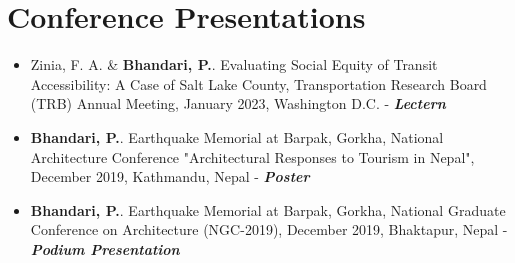 \section{\faAddressCard \textbf{ Conference Presentations}}
    \begin{itemize}[leftmargin=0.15in, label={}]
    	\item{Zinia, F. A. \& \textbf{Bhandari, P.}. Evaluating Social Equity of Transit Accessibility: A Case of Salt Lake County, Transportation Research Board (TRB) Annual Meeting, January 2023, Washington D.C. - \textbf{\textit{Lectern}}} \\
        \item{\textbf{Bhandari, P.}. Earthquake Memorial at Barpak, Gorkha, National Architecture Conference "Architectural Responses to Tourism in Nepal", December 2019, Kathmandu, Nepal - \textbf{\textit{Poster}}} \\
        \item{\textbf{Bhandari, P.}. Earthquake Memorial at Barpak, Gorkha, National Graduate Conference on Architecture (NGC-2019), December 2019, Bhaktapur, Nepal - \textbf{\textit{Podium Presentation}}} \\
    \end{itemize}